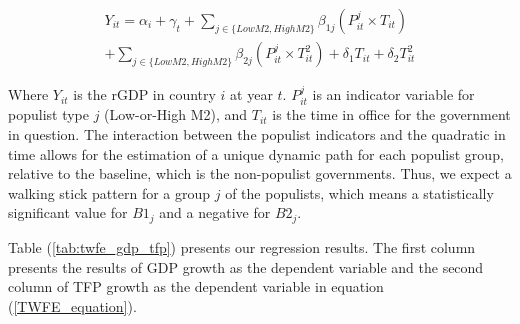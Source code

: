 \documentclass{OUP-EJ}
\begin{document}
\begin{multline}
    Y_{it}=\alpha_i+\gamma_t+\sum_{j \in \{Low M2, High M2\}}\beta_{1j}\left(P^{j}_{it} \times T_{it} \right) \\
    + \sum_{j \in \{Low M2, High M2\}}\beta_{2j}\left(P^{j}_{it} \times T^{2}_{it} \right)+\delta_1T_{it}+\delta_2T^{2}_{it}
    \label{TWFE_equation}
\end{multline}

Where $Y_{it}$ is the rGDP in country $i$ at year $t$. $P^j_{it}$ is an indicator variable for populist type $j$ (Low-or-High M2), and $T_{it}$ is the time in office for the government in question. The interaction between the populist indicators and the quadratic in time allows for the estimation of a unique dynamic path for each populist group, relative to the baseline, which is the non-populist governments. Thus, we expect a walking stick pattern for a group $j$ of the populists, which means a statistically significant value for $B1_j$ and a negative for $B2_j$.

Table (\ref{tab:twfe_gdp_tfp}) presents our regression results. The first column presents the results of GDP growth as the dependent variable and the second column of TFP growth as the dependent variable in equation (\ref{TWFE_equation}).  
\end{document}

